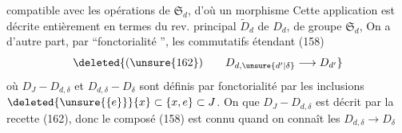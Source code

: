 compatible avec les opérations de $\mathfrak S_d$, d'où un morphisme
 Cette application est décrite entièrement en termes du rev. principal $\widetilde D_d$ de $D_d$, de groupe $\mathfrak S_d$,  On a d'autre part, par ``fonctorialité '', les  commutatifs étendant (158)
\[
\deleted{(\unsure{162})\qquad D_{d,\unsure{d'|\delta}}\longrightarrow D_{d'}}
\]
où $D_J-D_{d,\delta}$ et $D_{d,\delta}-D_\delta$ sont définis par fonctorialité par les inclusions $\deleted{\unsure{\{e\}}}\{x\}\subset\{x,e\}\subset J$. On  que $D_J-D_{d,\delta}$ est décrit par la recette (162), donc le composé (158) est connu quand on connaît les $D_{d,\delta}\longrightarrow D_\delta$
